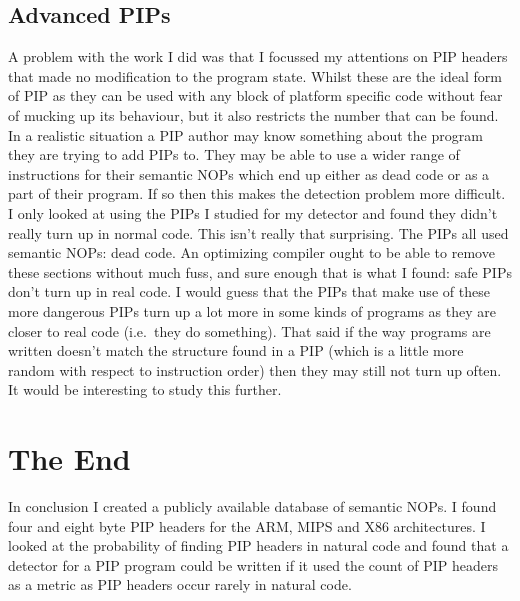 \documentclass[10pt,]{book}
\begin{document}
\subsection{Advanced PIPs}

A problem with the work I did was that I focussed my attentions on PIP
headers that made no modification to the program state. Whilst these are
the ideal form of PIP as they can be used with any block of platform
specific code without fear of mucking up its behaviour, but it also
restricts the number that can be found. In a realistic situation a PIP
author may know something about the program they are trying to add PIPs
to. They may be able to use a wider range of instructions for their
semantic NOPs which end up either as dead code or as a part of their
program. If so then this makes the detection problem more difficult. I
only looked at using the PIPs I studied for my detector and found they
didn't really turn up in normal code. This isn't really that surprising.
The PIPs all used semantic NOPs: dead code. An optimizing compiler ought
to be able to remove these sections without much fuss, and sure enough
that is what I found: safe PIPs don't turn up in real code. I would
guess that the PIPs that make use of these more dangerous PIPs turn up a
lot more in some kinds of programs as they are closer to real code
(i.e.~they do something). That said if the way programs are written
doesn't match the structure found in a PIP (which is a little more
random with respect to instruction order) then they may still not turn
up often. It would be interesting to study this further.

\section{The End}

In conclusion I created a publicly available database of semantic NOPs.
I found four and eight byte PIP headers for the ARM, MIPS and X86
architectures. I looked at the probability of finding PIP headers in
natural code and found that a detector for a PIP program could be
written if it used the count of PIP headers as a metric as PIP headers
occur rarely in natural code.
\end{document}
